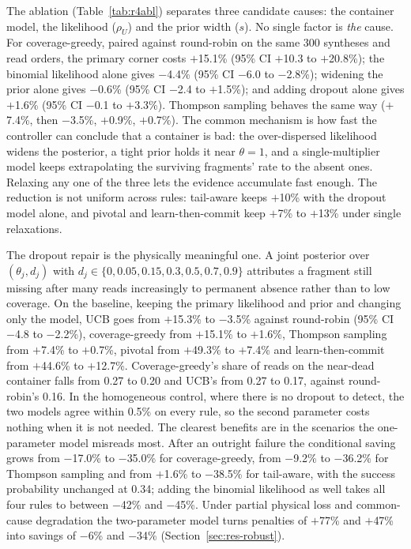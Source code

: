 \documentclass[acmsmall,screen]{acmart}
\begin{document}
The ablation (Table~\ref{tab:r4abl}) separates three candidate causes: the container model, the
likelihood ($\rho_U$) and the prior width ($s$).  No single factor is \emph{the} cause.  For
coverage-greedy, paired against round-robin on the same 300 syntheses and read orders, the primary
corner costs $+$15.1\% (95\% CI $+$10.3 to $+$20.8\%); the binomial likelihood alone gives $-$4.4\% (95\% CI $-$6.0 to $-$2.8\%); widening the prior
alone gives $-$0.6\% (95\% CI $-$2.4 to $+$1.5\%); and adding dropout alone gives $+$1.6\% (95\% CI $-$0.1 to $+$3.3\%).  Thompson sampling behaves the
same way ($+$7.4\%, then $-$3.5\%, $+$0.9\%, $+$0.7\%).  The common mechanism is how fast the controller
can conclude that a container is bad: the over-dispersed likelihood widens the posterior, a tight prior
holds it near $\theta{=}1$, and a single-multiplier model keeps extrapolating the surviving fragments'
rate to the absent ones.  Relaxing any one of the three lets the evidence accumulate fast enough.  The
reduction is not uniform across rules: tail-aware keeps $+$10\% with the dropout model alone, and
pivotal and learn-then-commit keep $+$7\% to $+$13\% under single relaxations.

The dropout repair is the physically meaningful one.  A joint posterior over $(\theta_j,d_j)$ with
$d_j\in\{0,0.05,\allowbreak0.15,\allowbreak0.3,\allowbreak0.5,\allowbreak0.7,\allowbreak0.9\}$ attributes a fragment still missing after many reads increasingly
to permanent absence rather than to low coverage.  On the baseline, keeping the primary likelihood and
prior and changing only the model, UCB goes from $+$15.3\% to $-$3.5\% against round-robin (95\% CI
$-$4.8 to $-$2.2\%), coverage-greedy from $+$15.1\% to $+$1.6\%, Thompson sampling from $+$7.4\% to $+$0.7\%,
pivotal from $+$49.3\% to $+$7.4\% and learn-then-commit from $+$44.6\% to $+$12.7\%.  Coverage-greedy's
share of reads on the near-dead container falls from 0.27 to 0.20 and UCB's from 0.27 to 0.17, against
round-robin's 0.16.  In the homogeneous control, where there is no dropout to detect, the two models agree
within 0.5\% on every rule, so the second parameter costs nothing when it is not needed.  The clearest
benefits are in the scenarios the one-parameter model misreads most.  After an outright failure the
conditional saving grows from $-$17.0\% to $-$35.0\% for coverage-greedy, from $-$9.2\% to $-$36.2\% for
Thompson sampling and from $+$1.6\% to $-$38.5\% for tail-aware, with the success probability unchanged at
0.34; adding the binomial likelihood as well takes all four rules to between $-$42\% and $-$45\%.  Under
partial physical loss and common-cause degradation the two-parameter model turns penalties of $+$77\% and
$+$47\% into savings of $-$6\% and $-$34\% (Section~\ref{sec:res-robust}).
\end{document}
